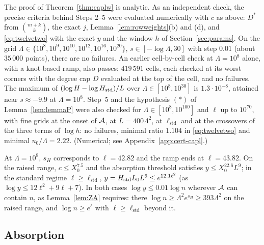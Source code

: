 \begin{remark}\label{rem:caplw-numerics}
The proof of Theorem~\ref{thm:caplw} is analytic. As an independent check, the precise criteria behind Steps 2--5 were evaluated
numerically with $c$ as above: $D^*$ from $\binom{m+k}k$, the exact $j$, Lemma~\ref{lem:rowweights}(b) and (d), and
\eqref{eq:twelvetwo} with the exact $y$ and the window $h$ of Section~\ref{sec:params}. On the grid $\Lambda\in\{10^8,10^9,10^{10},10^{12},10^{16},10^{20}\}$,
$s\in[-\log\Lambda,30]$ with step $0.01$ (about $35\,000$ points), there are no failures. An earlier cell-by-cell check at
$\Lambda=10^8$ alone, with a knot-based ramp, also passes: $419\,591$ cells, each checked at its worst corners with the degree
cap $D$ evaluated at the top of the cell, and no failures. The maximum of $(\log H-\log H_{\mathrm{std}})/L$ over
$\Lambda\in[10^8,10^{30}]$ is $1.3\cdot10^{-8}$, attained near $s\approx-9.9$ at $\Lambda=10^8$. Step~5 and the hypothesis $(*)$ of
Lemma~\ref{lem:lemmaP} were also checked for $\Lambda\in[10^8,10^{100}]$ and $\ell$ up to $10^{70}$, with fine grids at the onset of $\mathcal{A}$, at
$L=400\Lambda^2$, at $\ell_{\mathrm{std}}$ and at the crossovers of the three terms of $\log h$: no failures, minimal ratio $1.104$
in \eqref{eq:twelvetwo} and minimal $u_0/\Lambda=2.22$. (Numerical; see Appendix~\ref{app:cert-capl}.)
\end{remark}

\begin{remark}\label{rem:caplw-sizes}
At $\Lambda=10^8$, $s_H$ corresponds to $\ell=42.82$ and the ramp ends at $\ell=43.82$. On the raised range,
$c\le X_0^{7.5}$ and the absorption threshold satisfies $y\le X_0^{22.6}L^9$; in the standard regime $\ell\ge\ell_{\mathrm{std}}$,
$y=H_{\mathrm{std}} L_0L^6\le e^{12.1\ell^2}$ (as $\log y\le12\ell^2+9\ell+7$). In
both cases $\log y\le0.01\log n$ wherever $\mathcal{A}$ can contain $n$, as Lemma~\ref{lem:ZA} requires: there $\log n\ge
\Lambda^2e^{s_H}\ge393\Lambda^2$ on the raised range, and $\log n\ge e^{\ell}$ with $\ell\ge\ell_{\mathrm{std}}$ beyond it.
\end{remark}

\subsection{Absorption}\label{sec:queue-abs}

